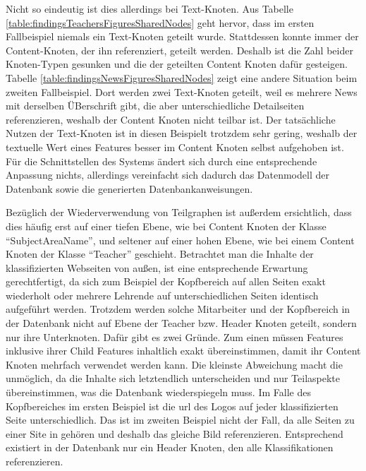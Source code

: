     Nicht so eindeutig ist dies allerdings bei Text-Knoten.
    Aus Tabelle \ref{table:findingsTeachersFiguresSharedNodes} geht hervor,
    dass im ersten Fallbeispiel niemals ein Text-Knoten geteilt wurde.
    Stattdessen konnte immer der Content-Knoten,
    der ihn referenziert, geteilt werden.
    Deshalb ist die Zahl beider Knoten-Typen gesunken und die der geteilten
    Content Knoten dafür gesteigen.
    Tabelle \ref{table:findingsNewsFiguresSharedNodes}
    zeigt eine andere Situation beim zweiten Fallbeispiel.
    Dort werden zwei Text-Knoten geteilt,
    weil es mehrere News mit derselben ÜBerschrift gibt,
    die aber unterschiedliche Detailseiten referenzieren,
    weshalb der Content Knoten nicht teilbar ist.
    Der tatsächliche Nutzen der Text-Knoten ist in diesen Beispielt trotzdem sehr gering,
    weshalb der textuelle Wert eines Features besser im Content Knoten selbst aufgehoben ist.
    Für die Schnittstellen des Systems ändert sich durch eine entsprechende Anpassung nichts,
    allerdings vereinfacht sich dadurch das Datenmodell der Datenbank sowie
    die generierten Datenbankanweisungen.

    Bezüglich der Wiederverwendung von Teilgraphen ist außerdem ersichtlich,
    dass dies häufig erst auf einer tiefen Ebene,
    wie bei Content Knoten der Klasse "`SubjectAreaName"',
    und seltener auf einer hohen Ebene,
    wie bei einem Content Knoten der Klasse "`Teacher"' geschieht.
    Betrachtet man die Inhalte der klassifizierten Webseiten von außen,
    ist eine entsprechende Erwartung gerechtfertigt,
    da sich zum Beispiel der Kopfbereich auf allen Seiten exakt wiederholt
    oder mehrere Lehrende auf unterschiedlichen Seiten identisch aufgeführt werden.
    Trotzdem werden solche Mitarbeiter und der Kopfbereich in der Datenbank
    nicht auf Ebene der Teacher bzw. Header Knoten geteilt,
    sondern nur ihre Unterknoten.
    Dafür gibt es zwei Gründe.
    Zum einen müssen Features inklusive ihrer Child Features inhaltlich
    exakt übereinstimmen, damit ihr Content Knoten mehrfach verwendet werden kann.
    Die kleinste Abweichung macht die unmöglich,
    da die Inhalte sich letztendlich unterscheiden und nur Teilaspekte übereinstimmen,
    was die Datenbank wiederspiegeln muss.
    Im Falle des Kopfbereiches im ersten Beispiel ist die \gls{url} des Logos
    auf jeder klassifizierten Seite unterschiedlich.
    Das ist im zweiten Beispiel nicht der Fall,
    da alle Seiten zu einer Site in {\wordpress} gehören
    und deshalb das gleiche Bild referenzieren.
    Entsprechend existiert in der Datenbank nur ein Header Knoten,
    den alle Klassifikationen referenzieren.
    
